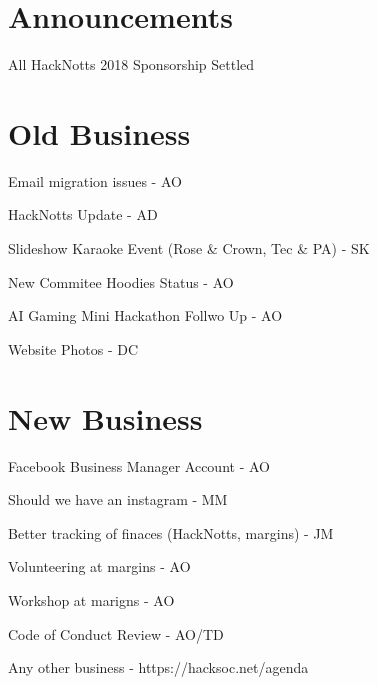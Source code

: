 \documentclass[11pt,hacksoc, agenda]{meetingmins}
\begin{document}
\maketitle

\section{Announcements}
\begin{items}
  \item All HackNotts 2018 Sponsorship Settled
\end{items}

\section{Old Business}
\begin{items}
  \item Email migration issues - AO
  \item HackNotts Update - AD
  \item Slideshow Karaoke Event (Rose \& Crown, Tec \& PA) - SK
  \item New Commitee Hoodies Status - AO
  \item AI Gaming Mini Hackathon Follwo Up - AO
  \item Website Photos - DC
\end{items}

\section{New Business}
\begin{items}
  \item Facebook Business Manager Account - AO
  \item Should we have an instagram - MM
  \item Better tracking of finaces (HackNotts, margins) - JM
  \item Volunteering at margins - AO
  \item Workshop at marigns - AO
  \item Code of Conduct Review - AO/TD
  \item Any other business - https://hacksoc.net/agenda
\end{items}

\vspace{1em}
\nextmeeting{}
\end{document}
